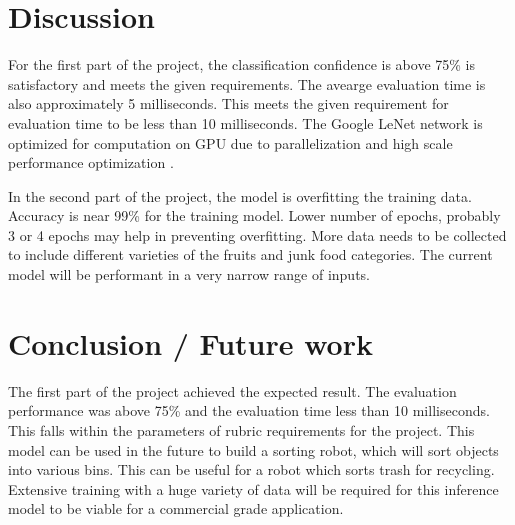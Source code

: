 \documentclass[10pt,journal,compsoc]{IEEEtran}
\begin{document}
%

\section{Discussion}
For the first part of the project, the classification confidence is above 75\% is satisfactory and meets the given requirements. The avearge evaluation time is also approximately 5 milliseconds. This meets the given requirement for evaluation time to be less than 10 milliseconds. The Google LeNet network is optimized for computation on GPU due to parallelization and high scale performance optimization \cite{DBLP}.

In the second part of the project, the model is overfitting the training data. Accuracy is near 99\% for the training model. Lower number of epochs, probably 3 or 4 epochs may help in preventing overfitting. More data needs to be collected to include different varieties of the fruits and junk food categories. The current model will be performant in a very narrow range of inputs. 

\section{Conclusion / Future work}
The first part of the project achieved the expected result. The evaluation performance was above 75\% and the evaluation time less than 10 milliseconds. This falls within the parameters of rubric requirements for the project. This model can be used in the future to build a sorting robot, which will sort objects into various bins. This can be useful for a robot which sorts trash for recycling. Extensive training with a huge variety of data will be required for this inference model to be viable for a commercial grade application.
\end{document}
